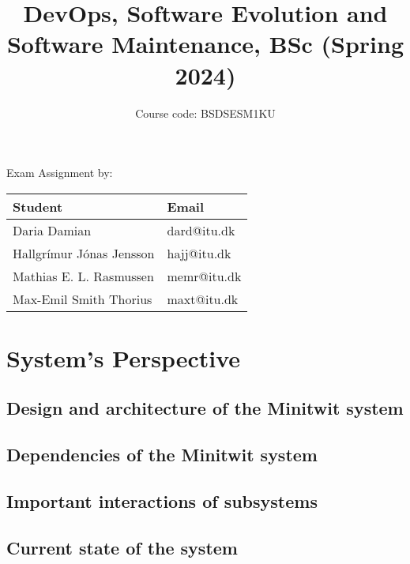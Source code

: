 \documentclass[12pt, a4paper]{book}
\title{DevOps, Software Evolution and Software Maintenance, BSc (Spring 2024)}
\author{Course code: BSDSESM1KU}
\begin{document}
\begin{minipage}{\textwidth}
\maketitle

\begin{center}
    Exam Assignment by: \\
    \hfill \break
    \bgroup
    \def\arraystretch{1.5}%
    \begin{tabularx}{0.8\textwidth} { 
      | >{\centering\arraybackslash}X 
      | >{\centering\arraybackslash}X | }
     \hline
     \cellcolor[HTML]{EFEFEF} Student & \cellcolor[HTML]{EFEFEF} Email \\
     \hline
     Daria Damian & dard@itu.dk \\
     \hline
     Hallgrímur Jónas Jensson & hajj@itu.dk \\
    \hline
     Mathias E. L. Rasmussen & memr@itu.dk \\
    \hline
     Max-Emil Smith Thorius & maxt@itu.dk \\
    \hline
    \end{tabularx}
    \egroup
\end{center}
\end{minipage}
\tableofcontents
\chapter{System's Perspective}

\section{Design and architecture of the Minitwit system}

\section{Dependencies of the Minitwit system}

\section{Important interactions of subsystems}

\section{Current state of the system}
\end{document}
